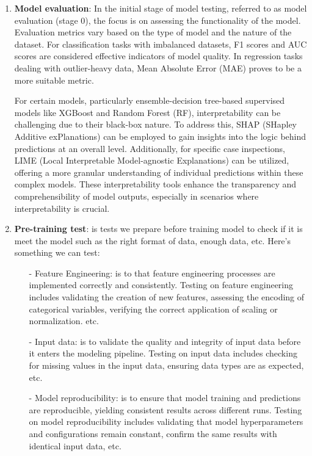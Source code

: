 \documentclass[12pt,a4paper]{article}
\begin{document}
\begin{enumerate}
	\item \textbf{Model evaluation}: In the initial stage of model testing, referred to as model evaluation (stage 0), the focus is on assessing the functionality of the model. Evaluation metrics vary based on the type of model and the nature of the dataset. For classification tasks with imbalanced datasets, F1 scores and AUC scores are considered effective indicators of model quality. In regression tasks dealing with outlier-heavy data, Mean Absolute Error (MAE) proves to be a more suitable metric.
	
	For certain models, particularly ensemble-decision tree-based supervised models like XGBoost and Random Forest (RF), interpretability can be challenging due to their black-box nature. To address this, SHAP (SHapley Additive exPlanations) can be employed to gain insights into the logic behind predictions at an overall level. Additionally, for specific case inspections, LIME (Local Interpretable Model-agnostic Explanations) can be utilized, offering a more granular understanding of individual predictions within these complex models. These interpretability tools enhance the transparency and comprehensibility of model outputs, especially in scenarios where interpretability is crucial.
	
	
	\item \textbf{Pre-training test}: is tests we prepare before training model to check if it is meet the model such as the right format of data, enough data, etc. Here's something we can test:
		\begin{itemize}
			\item[-] Feature Engineering: is to that feature engineering processes are implemented correctly and consistently. Testing on feature engineering includes validating the creation of new features, assessing the encoding of categorical variables, verifying the correct application of scaling or normalization. etc.
			
			\item[-] Input data: is to validate the quality and integrity of input data before it enters the modeling pipeline. Testing on input data includes checking for missing values in the input data, ensuring data types are as expected, etc.
			
			\item[-] Model reproducibility: is to ensure that model training and predictions are reproducible, yielding consistent results across different runs. Testing on model reproducibility includes validating that model hyperparameters and configurations remain constant, confirm the same results with identical input data, etc.
		\end{itemize}
		

\end{enumerate}
\end{document}

